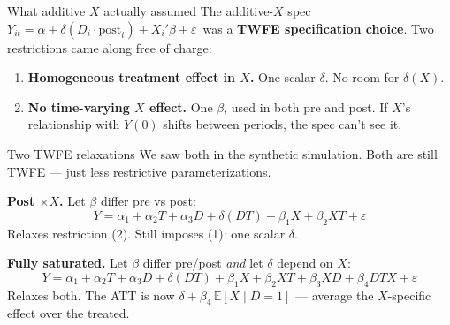 \documentclass[11pt,aspectratio=169]{beamer}
\begin{document}
\begin{frame}{What additive $X$ actually assumed}
\vspace{0.4em}
The additive-$X$ spec\, $Y_{it} = \alpha + \delta(D_i{\cdot}\text{post}_t) + X_i'\beta + \varepsilon$\, was a \textbf{TWFE specification choice}. \;Two restrictions came along free of charge:
\vspace{0.6em}
\begin{enumerate}\setlength\itemsep{4pt}
  \item \textbf{Homogeneous treatment effect in $X$.} \;One scalar $\delta$. \;No room for $\delta(X)$.
  \item \textbf{No time-varying $X$ effect.} \;One $\beta$, used in both pre and post. \;If $X$'s relationship with $Y(0)$ shifts between periods, the spec can't see it.
\end{enumerate}
\vspace{0.6em}
\end{frame}

\begin{frame}{Two TWFE relaxations}
\vspace{0.4em}
We saw both in the synthetic simulation. \;Both are still TWFE --- just less restrictive parameterizations.
\vspace{0.6em}

\textbf{Post $\times X$.} \;Let $\beta$ differ pre vs post:
\[
Y = \alpha_1 + \alpha_2 T + \alpha_3 D + \delta(DT) + \beta_1 X + \beta_2 XT + \varepsilon
\]
Relaxes restriction (2). \;Still imposes (1): one scalar $\delta$.

\vspace{0.5em}
\textbf{Fully saturated.} \;Let $\beta$ differ pre/post \textit{and} let $\delta$ depend on $X$:
\[
Y = \alpha_1 + \alpha_2 T + \alpha_3 D + \delta(DT) + \beta_1 X + \beta_2 XT + \beta_3 XD + \beta_4 DTX + \varepsilon
\]
Relaxes both. \;The ATT is now $\delta + \beta_4\,\mathbb{E}[X \mid D{=}1]$ --- average the $X$-specific effect over the treated.
\end{frame}
\end{document}
